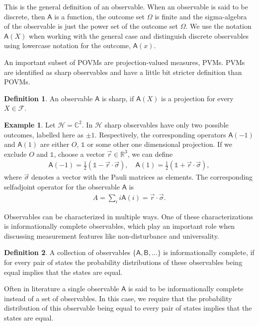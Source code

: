 \documentclass[a4paper,12pt]{wihuri}
\theoremstyle{definition}
\newtheorem{definition}{Definition}
\newtheorem{example}{Example}
\numberwithin{definition}{section}
\numberwithin{example}{section}
\numberwithin{theorem}{section}
\numberwithin{proposition}{section}
\numberwithin{lemma}{section}
\newcommand{\hi}{\mathcal{H}}%
\newcommand{\salg}{\mathcal{F}}%
\newcommand{\A}{\mathsf{A}}%
\newcommand{\B}{\mathsf{B}}%
\newcommand{\id}{\mathds{1}}
\newcommand{\cc}{\mathbb{C}^2}%
\begin{document}
This is the general definition of an observable. When an observable is said to be discrete, then $\A$ is a function, the outcome set $\Omega$ is finite and the sigma-algebra of the observable is just the power set of the outcome set $\Omega$. We use the notation $\A(X)$ when working with the general case and distinguish discrete observables using lowercase notation for the outcome, $\A(x)$. 

An important subset of POVMs are projection-valued measures, PVMs. PVMs are identified as sharp observables and have a little bit stricter definition than POVMs.
\begin{definition}
An observable $\A$ is sharp, if $\A(X)$ is a projection for every $X \in \salg$.
\end{definition}


\begin{example}
Let $\hi = \cc$. In $\hi$ sharp observables have only two possible outcomes, labelled here as $\pm 1$. Respectively, the corresponding operators $\A(-1)$ and $\A(1)$ are either $O$, $\id$ or some other one dimensional projection. If we exclude $O$ and $\id$, choose a vector $\vec{r} \in \mathbb{R}^3$, we can define
\begin{align*}
\A(-1) = \frac{1}{2}(\id - \vec{r}\cdot\vec{\sigma}), \quad \A(1) = \frac{1}{2}(\id + \vec{r}\cdot\vec{\sigma}),
\end{align*}
where $\vec{\sigma}$ denotes a vector with the Pauli matrices as elements. The corresponding selfadjoint operator for the observable $\A$ is 
\begin{align*}
A = \sum_i i\A(i) = \vec{r}\cdot \vec{\sigma}\text{.}
\end{align*}
\end{example}



Observables can be characterized in multiple ways. One of these characterizations is informationally complete observables, which play an important role when discussing measurement features like non-disturbance and universality.
\begin{definition}
A collection of observables $\lbrace \A, \B, \ldots \rbrace$ is informationally complete, if for every pair of states the probability distributions of these observables being equal implies that the states are equal.

Often in literature a single observable $\A$ is said to be informationally complete instead of a set of observables. In this case, we require that the probability distribution of this observable being equal to every pair of states implies that the states are equal.
\end{definition}
\end{document}
